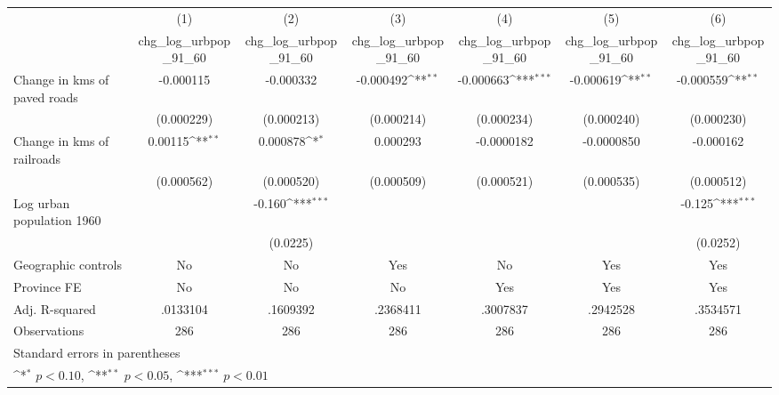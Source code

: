 {
\def\sym#1{\ifmmode^{#1}\else\(^{#1}\)\fi}
\begin{tabular}{l*{6}{c}}
\hline\hline
                    &\multicolumn{1}{c}{(1)}&\multicolumn{1}{c}{(2)}&\multicolumn{1}{c}{(3)}&\multicolumn{1}{c}{(4)}&\multicolumn{1}{c}{(5)}&\multicolumn{1}{c}{(6)}\\
                    &\multicolumn{1}{c}{chg\_log\_urbpop\_91\_60}&\multicolumn{1}{c}{chg\_log\_urbpop\_91\_60}&\multicolumn{1}{c}{chg\_log\_urbpop\_91\_60}&\multicolumn{1}{c}{chg\_log\_urbpop\_91\_60}&\multicolumn{1}{c}{chg\_log\_urbpop\_91\_60}&\multicolumn{1}{c}{chg\_log\_urbpop\_91\_60}\\
\hline
Change in kms of paved roads&   -0.000115         &   -0.000332         &   -0.000492\sym{**} &   -0.000663\sym{***}&   -0.000619\sym{**} &   -0.000559\sym{**} \\
                    &  (0.000229)         &  (0.000213)         &  (0.000214)         &  (0.000234)         &  (0.000240)         &  (0.000230)         \\
[1em]
Change in kms of railroads&     0.00115\sym{**} &    0.000878\sym{*}  &    0.000293         &  -0.0000182         &  -0.0000850         &   -0.000162         \\
                    &  (0.000562)         &  (0.000520)         &  (0.000509)         &  (0.000521)         &  (0.000535)         &  (0.000512)         \\
[1em]
Log urban population 1960&                     &      -0.160\sym{***}&                     &                     &                     &      -0.125\sym{***}\\
                    &                     &    (0.0225)         &                     &                     &                     &    (0.0252)         \\
\hline
Geographic controls &          No         &          No         &         Yes         &          No         &         Yes         &         Yes         \\
Province FE         &          No         &          No         &          No         &         Yes         &         Yes         &         Yes         \\
Adj. R-squared      &    .0133104         &    .1609392         &    .2368411         &    .3007837         &    .2942528         &    .3534571         \\
Observations        &         286         &         286         &         286         &         286         &         286         &         286         \\
\hline\hline
\multicolumn{7}{l}{\footnotesize Standard errors in parentheses}\\
\multicolumn{7}{l}{\footnotesize \sym{*} \(p<0.10\), \sym{**} \(p<0.05\), \sym{***} \(p<0.01\)}\\
\end{tabular}
}
